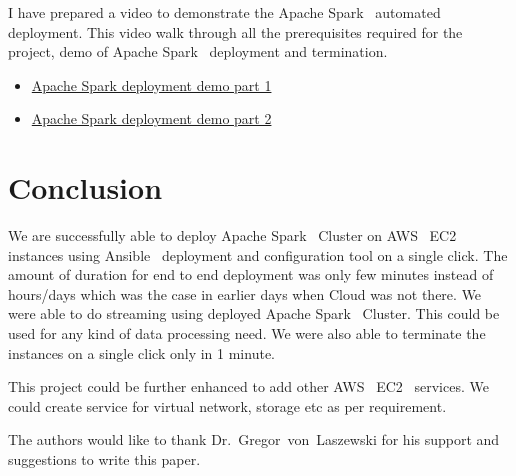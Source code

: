 I have prepared a video to demonstrate the Apache Spark~\cite{hid-sp18-511-www-spark} automated deployment. This video walk through all the prerequisites required for the project, demo of Apache Spark~\cite{hid-sp18-511-www-spark} deployment and termination.

\begin{itemize}
	\item \href{https://d1b10bmlvqabco.cloudfront.net/attach/jbkvbp3ed3m2ez/j6r57sr2IDo/jgenhk1lk5ly/hidsp18511\_AWS\_EC2\_Deployment\_1.mp4}{Apache Spark deployment demo part 1}
	\item \href{https://d1b10bmlvqabco.cloudfront.net/attach/jbkvbp3ed3m2ez/j6r57sr2IDo/jgeniacbvn7m/hidsp18511\_AWS\_EC2\_Deployment\_2.mp4}{Apache Spark deployment demo part 2}
\end{itemize}

\section{Conclusion}

We are successfully able to deploy Apache Spark~\cite{hid-sp18-511-www-spark} Cluster on AWS~\cite{hid-sp18-511-www-aws} EC2~\cite{hid-sp18-511-www-ec2} instances using Ansible~\cite{hid-sp18-511-www-ansible} deployment and configuration tool on a single click. The amount of duration for end to end deployment was only few minutes instead of hours/days which was the case in earlier days when Cloud was not there. We were able to do  streaming using deployed Apache Spark~\cite{hid-sp18-511-www-spark} Cluster. This could be used for any kind of data processing need. We were also able to terminate the instances on a single click only in 1 minute.

This project could be further enhanced to add other AWS~\cite{hid-sp18-511-www-aws} EC2~\cite{hid-sp18-511-www-ec2} services. We could create service for virtual network, storage etc as per requirement.

\begin{acks}

  The authors would like to thank Dr.~Gregor~von~Laszewski for his
  support and suggestions to write this paper.

\end{acks}


 

